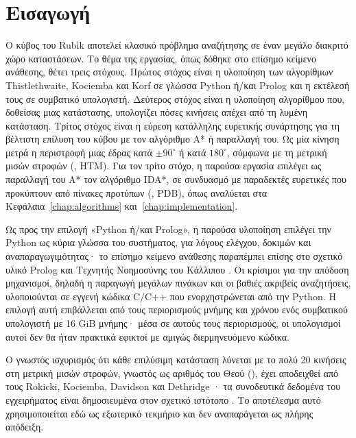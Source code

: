 \chapter{Εισαγωγή}\label{chap:intro}

Ο κύβος του Rubik αποτελεί κλασικό πρόβλημα αναζήτησης σε έναν μεγάλο διακριτό χώρο καταστάσεων. Το θέμα της εργασίας, όπως δόθηκε στο επίσημο κείμενο ανάθεσης, θέτει τρεις στόχους. Πρώτος στόχος είναι η υλοποίηση των αλγορίθμων Thistlethwaite, Kociemba και Korf σε γλώσσα Python ή/και Prolog και η εκτέλεσή τους σε συμβατικό υπολογιστή. Δεύτερος στόχος είναι η υλοποίηση αλγορίθμου που, δοθείσας μιας κατάστασης, υπολογίζει πόσες κινήσεις απέχει από τη λυμένη κατάσταση. Τρίτος στόχος είναι η εύρεση κατάλληλης ευρετικής συνάρτησης για τη βέλτιστη επίλυση του κύβου με τον αλγόριθμο A* ή παραλλαγή του. Ως μία κίνηση μετρά η περιστροφή μιας έδρας κατά $\pm 90^\circ$ ή κατά $180^\circ$, σύμφωνα με τη μετρική μισών στροφών (, HTM). Για τον τρίτο στόχο, η παρούσα εργασία επιλέγει ως παραλλαγή του A* τον αλγόριθμο IDA*, σε συνδυασμό με παραδεκτές ευρετικές που προκύπτουν από πίνακες προτύπων (, PDB), όπως αναλύεται στα Κεφάλαια~\ref{chap:algorithms} και~\ref{chap:implementation}.

Ως προς την επιλογή «Python ή/και Prolog», η παρούσα υλοποίηση επιλέγει την Python ως κύρια γλώσσα του συστήματος, για λόγους ελέγχου, δοκιμών και αναπαραγωγιμότητας· το επίσημο κείμενο ανάθεσης παραπέμπει επίσης στο σχετικό υλικό Prolog και Τεχνητής Νοημοσύνης του Κάλλιπου \cite{sgarbas2024prolog}. Οι κρίσιμοι για την απόδοση μηχανισμοί, δηλαδή η παραγωγή μεγάλων πινάκων και οι βαθιές ακριβείς αναζητήσεις, υλοποιούνται σε εγγενή κώδικα C/C++ που ενορχηστρώνεται από την Python. Η επιλογή αυτή επιβάλλεται από τους περιορισμούς μνήμης και χρόνου ενός συμβατικού υπολογιστή με 16 GiB μνήμης· μέσα σε αυτούς τους περιορισμούς, οι υπολογισμοί αυτοί δεν θα ήταν πρακτικά εφικτοί με αμιγώς διερμηνευόμενο κώδικα.

Ο γνωστός ισχυρισμός ότι κάθε επιλύσιμη κατάσταση λύνεται με το πολύ 20 κινήσεις στη μετρική μισών στροφών, γνωστός ως αριθμός του Θεού (), έχει αποδειχθεί από τους Rokicki, Kociemba, Davidson και Dethridge \cite{rokicki2013diameter}· τα συνοδευτικά δεδομένα του εγχειρήματος είναι δημοσιευμένα στον σχετικό ιστότοπο \cite{rokicki2010godsnumber}. Το αποτέλεσμα αυτό χρησιμοποιείται εδώ ως εξωτερικό τεκμήριο και δεν αναπαράγεται ως πλήρης απόδειξη.

